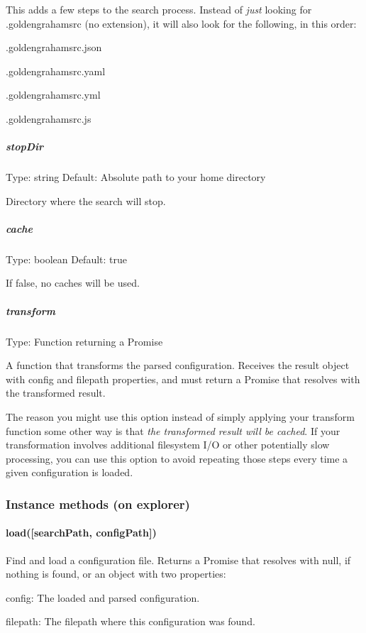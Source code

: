 This adds a few steps to the search process. Instead of {\itshape just} looking for {\ttfamily .goldengrahamsrc} (no extension), it will also look for the following, in this order\+:


\begin{DoxyItemize}
\item {\ttfamily .goldengrahamsrc.\+json}
\item {\ttfamily .goldengrahamsrc.\+yaml}
\item {\ttfamily .goldengrahamsrc.\+yml}
\item {\ttfamily .goldengrahamsrc.\+js}
\end{DoxyItemize}

\subparagraph*{stop\+Dir}

Type\+: {\ttfamily string} Default\+: Absolute path to your home directory

Directory where the search will stop.

\subparagraph*{cache}

Type\+: {\ttfamily boolean} Default\+: {\ttfamily true}

If {\ttfamily false}, no caches will be used.

\subparagraph*{transform}

Type\+: {\ttfamily Function} returning a Promise

A function that transforms the parsed configuration. Receives the result object with {\ttfamily config} and {\ttfamily filepath} properties, and must return a Promise that resolves with the transformed result.

The reason you might use this option instead of simply applying your transform function some other way is that {\itshape the transformed result will be cached}. If your transformation involves additional filesystem I/O or other potentially slow processing, you can use this option to avoid repeating those steps every time a given configuration is loaded.

\subsubsection*{Instance methods (on {\ttfamily explorer})}

\paragraph*{{\ttfamily load(\mbox{[}search\+Path, config\+Path\mbox{]})}}

Find and load a configuration file. Returns a Promise that resolves with {\ttfamily null}, if nothing is found, or an object with two properties\+:
\begin{DoxyItemize}
\item {\ttfamily config}\+: The loaded and parsed configuration.
\item {\ttfamily filepath}\+: The filepath where this configuration was found.
\end{DoxyItemize}

